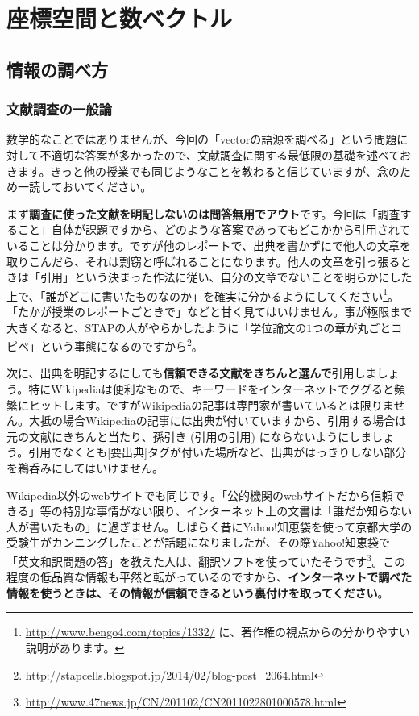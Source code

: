 \chapter{座標空間と数ベクトル}


\section{情報の調べ方}

\subsection{文献調査の一般論}

数学的なことではありませんが、今回の「vectorの語源を調べる」という問題に対して不適切な答案が多かったので、文献調査に関する最低限の基礎を述べておきます。きっと他の授業でも同じようなことを教わると信じていますが、念のため一読しておいてください。

まず\textbf{調査に使った文献を明記しないのは問答無用でアウト}です。今回は「調査すること」自体が課題ですから、どのような答案であってもどこかから引用されていることは分かります。ですが他のレポートで、出典を書かずにで他人の文章を取りこんだら、それは剽窃と呼ばれることになります。他人の文章を引っ張るときは「引用」という決まった作法に従い、自分の文章でないことを明らかにした上で、「誰がどこに書いたものなのか」を確実に分かるようにしてください\footnote{\url{http://www.bengo4.com/topics/1332/} に、著作権の視点からの分かりやすい説明があります。}。「たかが授業のレポートごときで」などと甘く見てはいけません。事が極限まで大きくなると、STAPの人がやらかしたように「学位論文の$1$つの章が丸ごとコピペ」という事態になるのですから\footnote{\url{http://stapcells.blogspot.jp/2014/02/blog-post_2064.html}}。

次に、出典を明記するにしても\textbf{信頼できる文献をきちんと選んで}引用しましょう。特にWikipediaは便利なもので、キーワードをインターネットでググると頻繁にヒットします。ですがWikipediaの記事は専門家が書いているとは限りません。大抵の場合Wikipediaの記事には出典が付いていますから、引用する場合は元の文献にきちんと当たり、孫引き (引用の引用) にならないようにしましょう。引用でなくとも[要出典]タグが付いた場所など、出典がはっきりしない部分を鵜呑みにしてはいけません。

Wikipedia以外のwebサイトでも同じです。「公的機関のwebサイトだから信頼できる」等の特別な事情がない限り、インターネット上の文書は「誰だか知らない人が書いたもの」に過ぎません。しばらく昔にYahoo!知恵袋を使って京都大学の受験生がカンニングしたことが話題になりましたが、その際Yahoo!知恵袋で「英文和訳問題の答」を教えた人は、翻訳ソフトを使っていたそうです\footnote{\url{http://www.47news.jp/CN/201102/CN2011022801000578.html}}。この程度の低品質な情報も平然と転がっているのですから、\textbf{インターネットで調べた情報を使うときは、その情報が信頼できるという裏付けを取ってください}。

